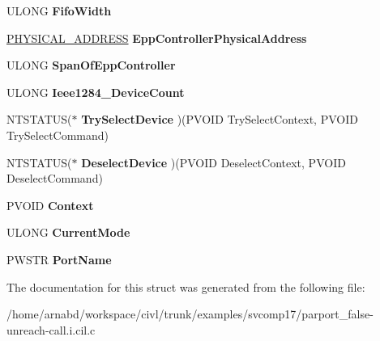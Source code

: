 \begin{DoxyCompactItemize}
\item 
\hypertarget{struct__PARALLEL__PNP__INFORMATION_ad895c061c2166944bb87484fd2a3036a}{}U\+L\+O\+N\+G {\bfseries Fifo\+Width}\label{struct__PARALLEL__PNP__INFORMATION_ad895c061c2166944bb87484fd2a3036a}

\item 
\hypertarget{struct__PARALLEL__PNP__INFORMATION_ab1957cbac4effa5c42b4c4ef8b6bd4ee}{}\hyperlink{union__LARGE__INTEGER}{P\+H\+Y\+S\+I\+C\+A\+L\+\_\+\+A\+D\+D\+R\+E\+S\+S} {\bfseries Epp\+Controller\+Physical\+Address}\label{struct__PARALLEL__PNP__INFORMATION_ab1957cbac4effa5c42b4c4ef8b6bd4ee}

\item 
\hypertarget{struct__PARALLEL__PNP__INFORMATION_ac1f99ca638817e7760ffc238df4826c4}{}U\+L\+O\+N\+G {\bfseries Span\+Of\+Epp\+Controller}\label{struct__PARALLEL__PNP__INFORMATION_ac1f99ca638817e7760ffc238df4826c4}

\item 
\hypertarget{struct__PARALLEL__PNP__INFORMATION_a01811836514bd35b74d91249bf9d3569}{}U\+L\+O\+N\+G {\bfseries Ieee1284\+\_\+Device\+Count}\label{struct__PARALLEL__PNP__INFORMATION_a01811836514bd35b74d91249bf9d3569}

\item 
\hypertarget{struct__PARALLEL__PNP__INFORMATION_aa596d79bfba12d4247363cb0bc82b178}{}N\+T\+S\+T\+A\+T\+U\+S($\ast$ {\bfseries Try\+Select\+Device} )(P\+V\+O\+I\+D Try\+Select\+Context, P\+V\+O\+I\+D Try\+Select\+Command)\label{struct__PARALLEL__PNP__INFORMATION_aa596d79bfba12d4247363cb0bc82b178}

\item 
\hypertarget{struct__PARALLEL__PNP__INFORMATION_a2d5372598834bcbf86abf46c77e1e9c1}{}N\+T\+S\+T\+A\+T\+U\+S($\ast$ {\bfseries Deselect\+Device} )(P\+V\+O\+I\+D Deselect\+Context, P\+V\+O\+I\+D Deselect\+Command)\label{struct__PARALLEL__PNP__INFORMATION_a2d5372598834bcbf86abf46c77e1e9c1}

\item 
\hypertarget{struct__PARALLEL__PNP__INFORMATION_ad5ce15cae12fa57277aa7568f72bb0a9}{}P\+V\+O\+I\+D {\bfseries Context}\label{struct__PARALLEL__PNP__INFORMATION_ad5ce15cae12fa57277aa7568f72bb0a9}

\item 
\hypertarget{struct__PARALLEL__PNP__INFORMATION_aaf5486890575b045aba27d99f35ed2ac}{}U\+L\+O\+N\+G {\bfseries Current\+Mode}\label{struct__PARALLEL__PNP__INFORMATION_aaf5486890575b045aba27d99f35ed2ac}

\item 
\hypertarget{struct__PARALLEL__PNP__INFORMATION_a26d6a4379ad9f6e717bd5bc2a4a3e0a2}{}P\+W\+S\+T\+R {\bfseries Port\+Name}\label{struct__PARALLEL__PNP__INFORMATION_a26d6a4379ad9f6e717bd5bc2a4a3e0a2}

\end{DoxyCompactItemize}


The documentation for this struct was generated from the following file\+:\begin{DoxyCompactItemize}
\item 
/home/arnabd/workspace/civl/trunk/examples/svcomp17/parport\+\_\+false-\/unreach-\/call.\+i.\+cil.\+c\end{DoxyCompactItemize}
